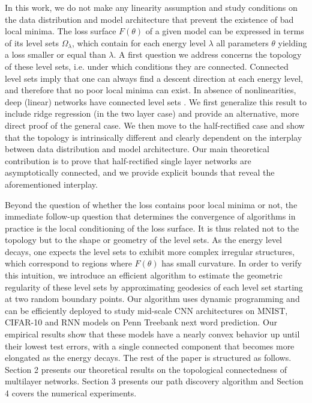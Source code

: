 In this work, we do not make any linearity assumption and study conditions 
on the data distribution and model architecture that prevent the existence 
of bad local minima. 
The loss surface $F(\theta)$ of a given model can be expressed in terms of its level sets $\Omega_\lambda$, which contain for each energy level $\lambda$ all parameters $\theta$ yielding a loss smaller or equal than $\lambda$. A first question we address concerns the topology of these level sets, i.e. under which conditions they are connected. Connected level sets imply that one can always find a descent direction at each energy level, and therefore that no poor local minima can exist. In absence of nonlinearities, deep (linear) networks have connected level sets \cite{kawaguchi2016deep}. We first generalize this result to include ridge regression (in the two layer case) and provide an alternative, more direct proof of the general case. We then move to the half-rectified case and show that the topology is intrinsically different and clearly dependent on the interplay between data distribution and model architecture. Our main theoretical contribution is to prove that half-rectified single layer networks are asymptotically connected, and we provide explicit bounds that reveal the aforementioned interplay.

Beyond the question of whether the loss contains poor local minima or not, the immediate follow-up question that determines the convergence of algorithms in practice is the local conditioning of the loss surface. It is thus related not to the topology but to the shape or geometry of the level sets. As the energy level decays, one expects the level sets to exhibit more complex irregular structures, which correspond to regions where $F(\theta)$ has small curvature. In order to verify this intuition, we introduce an efficient algorithm to estimate the geometric regularity of these level sets by approximating geodesics of each level set starting at two random boundary points. Our algorithm uses dynamic programming and can be efficiently deployed to study mid-scale CNN architectures on MNIST, CIFAR-10 and RNN models on Penn Treebank next word prediction. 
Our empirical results show that these models have a nearly convex behavior up until their lowest test errors, with a single connected component that becomes more elongated as the energy decays. 
The rest of the paper is structured as follows. Section 2 presents our theoretical results on the topological connectedness of multilayer networks. Section 3 presents our path discovery algorithm and Section 4 covers the numerical experiments.













